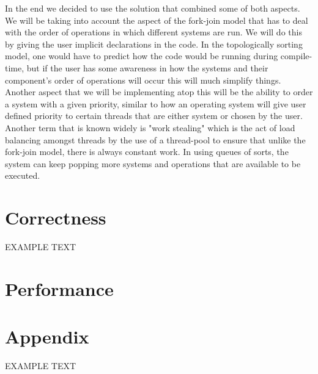 \documentclass[conference]{IEEEtran}
\begin{document}
    In the end we decided to use the solution that combined some of both aspects. We will be taking into account the aspect of the fork-join model that has to deal with the order of operations in which different systems are run. We will do this by giving the user implicit declarations in the code. In the topologically sorting model, one would have to predict how the code would be running during compile-time, but if the user has some awareness in how the systems and their component's order of operations will occur this will much simplify things. Another aspect that we will be implementing atop this will be the ability to order a system with a given priority, similar to how an operating system will give user defined priority to certain threads that are either system or chosen by the user. Another term that is known widely is "work stealing" which is the act of load balancing amongst threads by the use of a thread-pool to ensure that unlike the fork-join model, there is always constant work. In using queues of sorts, the system can keep popping more systems and operations that are available to be executed.


\section{Correctness}
EXAMPLE TEXT

\section{Performance}

\section{Appendix}
EXAMPLE TEXT

 
 
\end{document}

